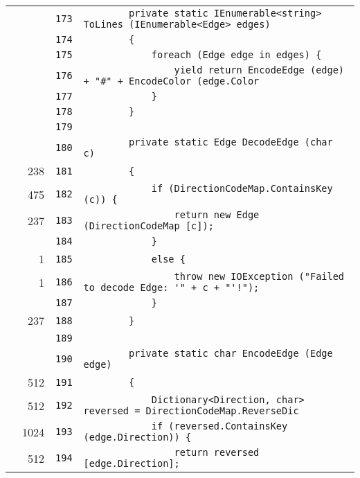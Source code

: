 \documentclass[a4paper,10pt]{article}
\begin{document}
\begin{longtable}[l]{lrrl}
\cellcolor{gray} &  & \verb~173~ & \verb~        private static IEnumerable<string> ToLines (IEnumerable<Edge> edges)~\\
\cellcolor{gray} &  & \verb~174~ & \verb~        {~\\
\cellcolor{gray} &  & \verb~175~ & \verb~            foreach (Edge edge in edges) {~\\
\cellcolor{gray} &  & \verb~176~ & \verb~                yield return EncodeEdge (edge) + "#" + EncodeColor (edge.Color~\\
\cellcolor{gray} &  & \verb~177~ & \verb~            }~\\
\cellcolor{gray} &  & \verb~178~ & \verb~        }~\\
\cellcolor{gray} &  & \verb~179~ & \verb~~\\
\cellcolor{gray} &  & \verb~180~ & \verb~        private static Edge DecodeEdge (char c)~\\
\cellcolor{green} & 238 & \verb~181~ & \verb~        {~\\
\cellcolor{green} & 475 & \verb~182~ & \verb~            if (DirectionCodeMap.ContainsKey (c)) {~\\
\cellcolor{green} & 237 & \verb~183~ & \verb~                return new Edge (DirectionCodeMap [c]);~\\
\cellcolor{gray} &  & \verb~184~ & \verb~            }~\\
\cellcolor{green} & 1 & \verb~185~ & \verb~            else {~\\
\cellcolor{green} & 1 & \verb~186~ & \verb~                throw new IOException ("Failed to decode Edge: '" + c + "'!");~\\
\cellcolor{gray} &  & \verb~187~ & \verb~            }~\\
\cellcolor{green} & 237 & \verb~188~ & \verb~        }~\\
\cellcolor{gray} &  & \verb~189~ & \verb~~\\
\cellcolor{gray} &  & \verb~190~ & \verb~        private static char EncodeEdge (Edge edge)~\\
\cellcolor{green} & 512 & \verb~191~ & \verb~        {~\\
\cellcolor{green} & 512 & \verb~192~ & \verb~            Dictionary<Direction, char> reversed = DirectionCodeMap.ReverseDic~\\
\cellcolor{green} & 1024 & \verb~193~ & \verb~            if (reversed.ContainsKey (edge.Direction)) {~\\
\cellcolor{green} & 512 & \verb~194~ & \verb~                return reversed [edge.Direction];~\\

\end{longtable}
\end{document}
